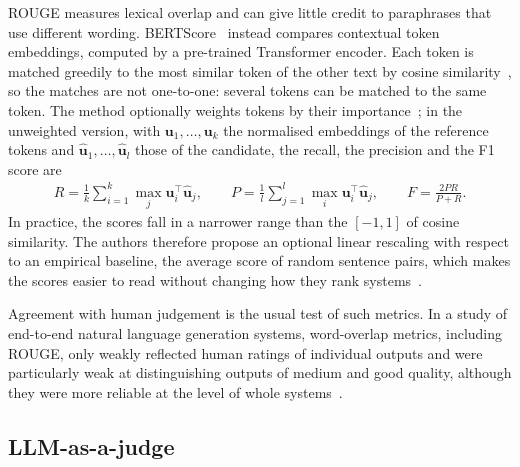 ROUGE measures lexical overlap and can give little credit to paraphrases that use different wording. BERTScore~\cite{zhang2020bertscore} instead compares contextual token embeddings, computed by a pre-trained Transformer encoder. Each token is matched greedily to the most similar token of the other text by cosine similarity~\cite{zhang2020bertscore}, so the matches are not one-to-one: several tokens can be matched to the same token. The method optionally weights tokens by their importance~\cite{zhang2020bertscore}; in the unweighted version, with $\mathbf{u}_1, \dots, \mathbf{u}_k$ the normalised embeddings of the reference tokens and $\hat{\mathbf{u}}_1, \dots, \hat{\mathbf{u}}_l$ those of the candidate, the recall, the precision and the F1 score are
\begin{align}
  R = \frac{1}{k} \sum_{i=1}^{k} \max_{j} \mathbf{u}_i^\top \hat{\mathbf{u}}_j, \qquad
  P = \frac{1}{l} \sum_{j=1}^{l} \max_{i} \mathbf{u}_i^\top \hat{\mathbf{u}}_j, \qquad
  F = \frac{2PR}{P + R}.
  \label{eq:bertscore}
\end{align}
In practice, the scores fall in a narrower range than the $[-1, 1]$ of cosine similarity. The authors therefore propose an optional linear rescaling with respect to an empirical baseline, the average score of random sentence pairs, which makes the scores easier to read without changing how they rank systems~\cite{zhang2020bertscore}.

Agreement with human judgement is the usual test of such metrics. In a study of end-to-end natural language generation systems, word-overlap metrics, including ROUGE, only weakly reflected human ratings of individual outputs and were particularly weak at distinguishing outputs of medium and good quality, although they were more reliable at the level of whole systems~\cite{novikova2017why}.

\subsection{LLM-as-a-judge}
\label{sec:llm-judge}

